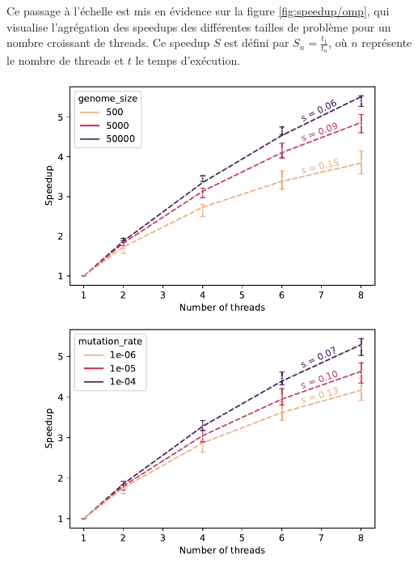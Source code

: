 \documentclass[a4paper, 10pt, twoside]{article}
\begin{document}
Ce passage à l'échelle est mis en évidence sur la figure \ref{fig:speedup/omp}, qui visualise l'agrégation des speedups des différentes tailles de problème pour un nombre croissant de threads.
Ce speedup $S$ est défini par $ S_n = \frac{t_1}{t_n} $, où $n$ représente le nombre de threads et $t$ le temps d'exécution.

\begin{figure}[htbp]
	\centering
	\begin{minipage}{0.32\textwidth}
		\centering
		\includegraphics[width=\textwidth]{img/speedup_genome_size.pdf}
	\end{minipage}
	\begin{minipage}{0.32\textwidth}
		\includegraphics[width=\textwidth]{img/speedup_mutation_rate.pdf}
	\end{minipage}
	\begin{minipage}{0.32\textwidth}

\end{minipage}
\end{figure}
\end{document}
